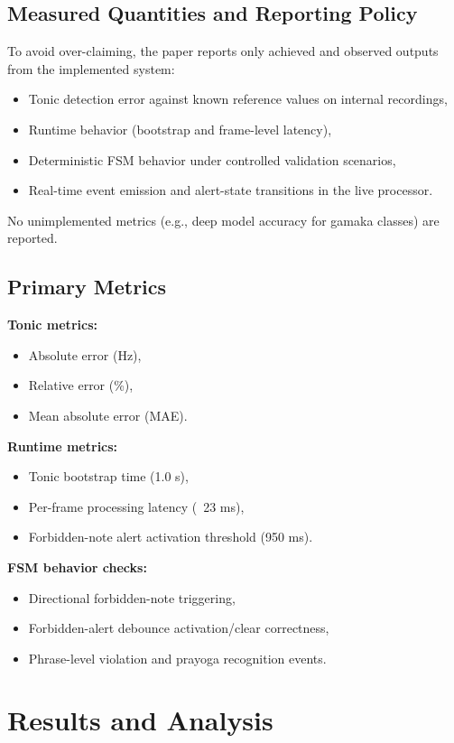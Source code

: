 \documentclass{ieeeaccess}
\begin{document}
\subsection{Measured Quantities and Reporting Policy}
To avoid over-claiming, the paper reports only achieved and observed outputs from the implemented system:
\begin{itemize}
\item Tonic detection error against known reference values on internal recordings,
\item Runtime behavior (bootstrap and frame-level latency),
\item Deterministic FSM behavior under controlled validation scenarios,
\item Real-time event emission and alert-state transitions in the live processor.
\end{itemize}
No unimplemented metrics (e.g., deep model accuracy for gamaka classes) are reported.

\subsection{Primary Metrics}
\textbf{Tonic metrics:}
\begin{itemize}
\item Absolute error (Hz),
\item Relative error (\%),
\item Mean absolute error (MAE).
\end{itemize}

\textbf{Runtime metrics:}
\begin{itemize}
\item Tonic bootstrap time (1.0 s),
\item Per-frame processing latency (~23 ms),
\item Forbidden-note alert activation threshold (950 ms).
\end{itemize}

\textbf{FSM behavior checks:}
\begin{itemize}
\item Directional forbidden-note triggering,
\item Forbidden-alert debounce activation/clear correctness,
\item Phrase-level violation and prayoga recognition events.
\end{itemize}

\section{Results and Analysis}
\label{sec:results}
\end{document}
